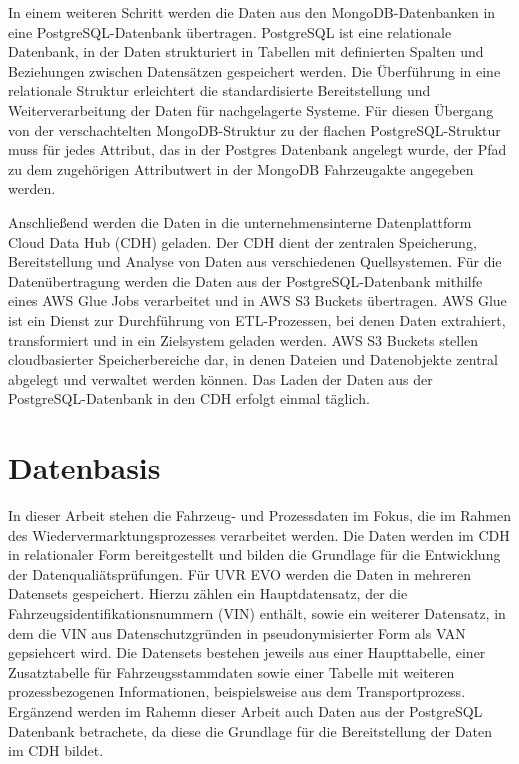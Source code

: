 \documentclass[../main.tex]{subfiles}
\begin{document}
In einem weiteren Schritt werden die Daten aus den MongoDB-Datenbanken in eine PostgreSQL-Datenbank übertragen. PostgreSQL ist eine relationale Datenbank, in der Daten strukturiert in Tabellen mit definierten Spalten und Beziehungen zwischen Datensätzen gespeichert werden. Die Überführung in eine relationale Struktur erleichtert die standardisierte Bereitstellung und Weiterverarbeitung der Daten für nachgelagerte Systeme. Für diesen Übergang von der verschachtelten MongoDB-Struktur zu der flachen PostgreSQL-Struktur muss für jedes Attribut, das in der Postgres Datenbank angelegt wurde, der Pfad zu dem zugehörigen Attributwert in der MongoDB Fahrzeugakte angegeben werden.

Anschließend werden die Daten in die unternehmensinterne Datenplattform Cloud Data Hub (CDH) geladen. Der CDH dient der zentralen Speicherung, Bereitstellung und Analyse von Daten aus verschiedenen Quellsystemen. Für die Datenübertragung werden die Daten aus der PostgreSQL-Datenbank mithilfe eines AWS Glue Jobs verarbeitet und in AWS S3 Buckets übertragen. AWS Glue ist ein Dienst zur Durchführung von ETL-Prozessen, bei denen Daten extrahiert, transformiert und in ein Zielsystem geladen werden. AWS S3 Buckets stellen cloudbasierter Speicherbereiche dar, in denen Dateien und Datenobjekte zentral abgelegt und verwaltet werden können. Das Laden der Daten aus der PostgreSQL-Datenbank in den CDH erfolgt einmal täglich.

\section{Datenbasis}

In dieser Arbeit stehen die Fahrzeug- und Prozessdaten im Fokus, die im Rahmen des Wiedervermarktungsprozesses verarbeitet werden. Die Daten werden im CDH in relationaler Form bereitgestellt und bilden die Grundlage für die Entwicklung der Datenqualiätsprüfungen. Für UVR EVO werden die Daten in mehreren Datensets gespeichert. Hierzu zählen ein Hauptdatensatz, der die Fahrzeugsidentifikationsnummern (VIN) enthält, sowie ein weiterer Datensatz, in dem die VIN aus Datenschutzgründen in pseudonymisierter Form als VAN gepsiehcert wird. 
Die Datensets bestehen jeweils aus einer Haupttabelle, einer Zusatztabelle für Fahrzeugsstammdaten sowie einer Tabelle mit weiteren prozessbezogenen Informationen, beispielsweise aus dem Transportprozess. Ergänzend werden im Rahemn dieser Arbeit auch Daten aus der PostgreSQL Datenbank betrachete, da diese die Grundlage für die Bereitstellung der Daten im CDH bildet.
\end{document}
